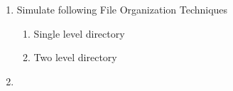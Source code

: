 \documentclass{article}
\newcommand{\question}[2]{
	\item [#1.] #2
}
\newcommand{\answer}[1]{\item[$\rightarrow$] \inputminted{c}{#1}}
\begin{document}
	\begin{enumerate}[label=\roman*)]
		\question{8}{
			Simulate following File Organization Techniques
			\begin{enumerate}
				\item Single level directory
				\item Two level directory
			\end{enumerate}
		}

		\answer{lab8.c} \newpage

	\end{enumerate}
\end{document}
